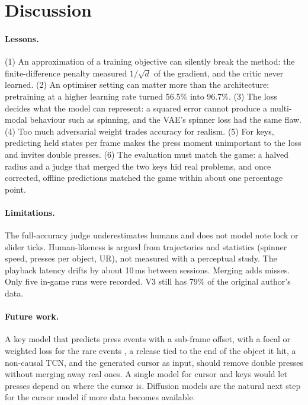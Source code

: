 \documentclass[11pt,a4paper]{article}
\begin{document}
\section{Discussion}
\paragraph{Lessons.}
(1) An approximation of a training objective can silently break the method: the finite-difference penalty
measured $1/\sqrt d$ of the gradient, and the critic never learned. (2) An optimiser setting can matter more
than the architecture: pretraining at a higher learning rate turned 56.5\% into 96.7\%. (3) The loss decides
what the model can represent: a squared error cannot produce a multi-modal behaviour such as spinning, and the
VAE's spinner loss had the same flaw. (4) Too much adversarial weight trades accuracy for realism. (5) For
keys, predicting held states per frame makes the press moment unimportant to the loss and invites double
presses. (6) The evaluation must match the game: a halved radius and a judge that merged the two keys hid
real problems, and once corrected, offline predictions matched the game within about one percentage point.

\paragraph{Limitations.}
The full-accuracy judge underestimates humans and does not model note lock or slider ticks. Human-likeness is
argued from trajectories and statistics (spinner speed, presses per object, UR), not measured with a
perceptual study. The playback latency drifts by about 10\,ms between sessions. Merging adds misses. Only five
in-game runs were recorded. V3 still has 79\% of the original author's data.

\paragraph{Future work.}
A key model that predicts press events with a sub-frame offset, with a focal or weighted loss for the rare
events \citep{lin2017}, a release tied to the end of the object it hit, a non-causal TCN, and the generated
cursor as input, should remove double presses without merging away real ones. A single model for cursor and
keys would let presses depend on where the cursor is. Diffusion models \citep{ho2020, tevet2023} are the
natural next step for the cursor model if more data becomes available.
\end{document}
